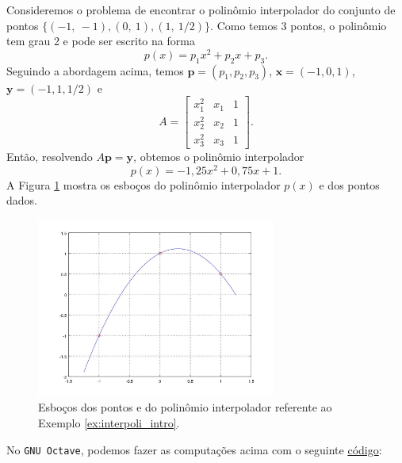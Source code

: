 \begin{ex}\label{ex:interpoli_intro}
  Consideremos o problema de encontrar o polinômio interpolador do conjunto de pontos $\{(-1,~-1), (0,~1), (1,~1/2)\}$. Como temos 3 pontos, o polinômio tem grau 2 e pode ser escrito na forma
  \begin{equation}
    p(x) = p_1x^2 + p_2x + p_3.
  \end{equation}
  Seguindo a abordagem acima, temos $\pmb{p}=(p_1, p_2, p_3)$, $\pmb{x} = (-1, 0, 1)$, $\pmb{y}=(-1, 1, 1/2)$ e
  \begin{equation}
    A =
    \begin{bmatrix}
      x_1^2 & x_1 & 1\\
      x_2^2 & x_2 & 1\\
      x_3^2 & x_3 & 1
    \end{bmatrix}.
  \end{equation}
  Então, resolvendo $A\pmb{p} = \pmb{y}$, obtemos o polinômio interpolador
  \begin{equation}
    p(x) = -1,25x^2 + 0,75x + 1.
  \end{equation}
A Figura \ref{fig:interpoli_intro} mostra os esboços do polinômio interpolador $p(x)$ e  dos pontos dados.

\begin{figure}[h!]
  \centering
  \includegraphics[width=0.7\textwidth]{./cap_interp/dados/ex_interpoli_intro/fig_interpoli_intro}
  \caption{Esboços dos pontos e do polinômio interpolador referente ao Exemplo \ref{ex:interpoli_intro}.}
  \label{fig:interpoli_intro}
\end{figure}

\ifisoctave
No \verb+GNU Octave+, podemos fazer as computações acima com o seguinte \href{https://github.com/phkonzen/notas/blob/master/src/MatematicaNumerica/cap_interp/dados/ex_interpoli_intro/ex_interpoli_intro.m}{código}:

\fi
\end{ex}

